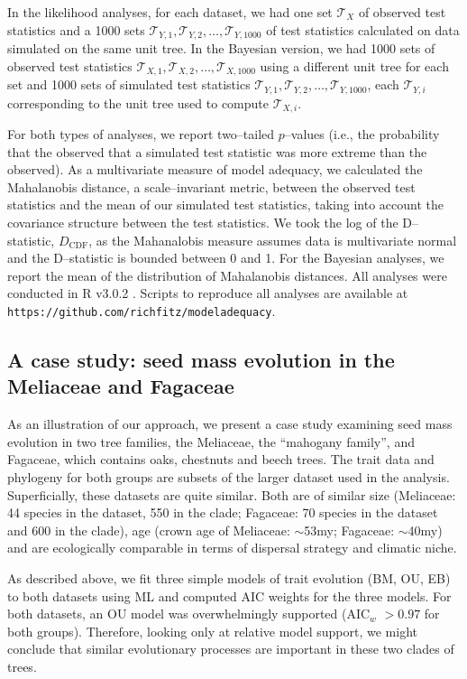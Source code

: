 \documentclass[a4paper,11pt]{article}
\begin{document}
In the likelihood analyses, for each dataset, we had one set $\mathcal{T}_X$ of observed test statistics and a 1000 sets $\mathcal{T}_{Y,1}, \mathcal{T}_{Y,2}, \ldots, \mathcal{T}_{Y,1000}$ of test statistics calculated on data simulated on the same unit tree. In the Bayesian version, we had 1000 sets of observed test statistics $\mathcal{T}_{X,1}, \mathcal{T}_{X,2}, \ldots, \mathcal{T}_{X,1000}$ using a different unit tree for each set and 1000 sets of simulated test statistics $\mathcal{T}_{Y,1}, \mathcal{T}_{Y,2}, \ldots, \mathcal{T}_{Y,1000}$, each $\mathcal{T}_{Y,i}$ corresponding to the unit tree used to compute $\mathcal{T}_{X,i}$.
 
For both types of analyses, we report two--tailed $p$--values (i.e., the probability that the observed that a simulated test statistic was more extreme than the observed). As a multivariate measure of model adequacy, we calculated the Mahalanobis distance, a scale--invariant metric, between the observed test statistics and the mean of our simulated test statistics, taking into account the covariance structure between the test statistics. We took the log of the  D--statistic, $D_{\text{CDF}}$, as the Mahanalobis measure assumes data is multivariate normal and the D--statistic is bounded between 0 and 1. For the Bayesian analyses, we report the mean of the distribution of Mahalanobis distances. All analyses were conducted in R v3.0.2 \citep{R}. Scripts to reproduce all analyses are available at \texttt{https://github.com/richfitz/modeladequacy}.
  
\subsection{A case study: seed mass evolution in the Meliaceae and Fagaceae }
As an illustration of our approach, we present a case study examining seed mass evolution in two tree families, the Meliaceae, the ``mahogany family'', and Fagaceae, which contains oaks, chestnuts and beech trees. The trait data and phylogeny for both groups are subsets of the larger dataset used in the analysis. Superficially, these datasets are quite similar. Both are of similar size (Meliaceae: 44 species in the dataset, 550 in the clade; Fagaceae: 70 species in the dataset and 600 in the clade), age (crown age of Meliaceae: $\sim$53my; Fagaceae: $\sim$40my) and are ecologically comparable in terms of dispersal strategy and climatic niche. 

As described above, we fit three simple models of trait evolution (BM, OU, EB) to both datasets using ML and computed AIC weights \citep[AIC$_w$;][]{Akaike1974, aicweight} for the three models. For both datasets, an OU model was overwhelmingly supported (AIC$_w$ $>0.97$ for both groups). Therefore, looking only at relative model support, we might conclude that similar evolutionary processes are important in these two clades of trees.
\end{document}
